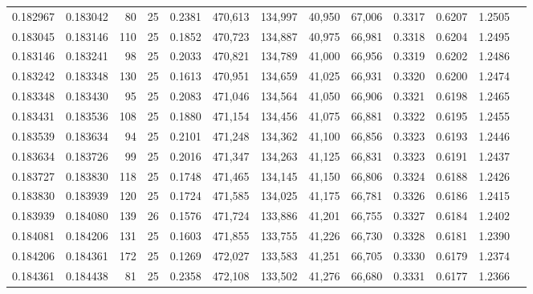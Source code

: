 \begin{tabular}{rrrrrrrrrrrrr}
0.182967 & 0.183042 &    80 &  25 &                                     0.2381 & 470,613 & 134,997 &  40,950 &  67,006 & 0.3317 & 0.6207 & 1.2505 \\
0.183045 & 0.183146 &   110 &  25 &                                     0.1852 & 470,723 & 134,887 &  40,975 &  66,981 & 0.3318 & 0.6204 & 1.2495 \\
0.183146 & 0.183241 &    98 &  25 &                                     0.2033 & 470,821 & 134,789 &  41,000 &  66,956 & 0.3319 & 0.6202 & 1.2486 \\
0.183242 & 0.183348 &   130 &  25 &                                     0.1613 & 470,951 & 134,659 &  41,025 &  66,931 & 0.3320 & 0.6200 & 1.2474 \\
0.183348 & 0.183430 &    95 &  25 &                                     0.2083 & 471,046 & 134,564 &  41,050 &  66,906 & 0.3321 & 0.6198 & 1.2465 \\
0.183431 & 0.183536 &   108 &  25 &                                     0.1880 & 471,154 & 134,456 &  41,075 &  66,881 & 0.3322 & 0.6195 & 1.2455 \\
0.183539 & 0.183634 &    94 &  25 &                                     0.2101 & 471,248 & 134,362 &  41,100 &  66,856 & 0.3323 & 0.6193 & 1.2446 \\
0.183634 & 0.183726 &    99 &  25 &                                     0.2016 & 471,347 & 134,263 &  41,125 &  66,831 & 0.3323 & 0.6191 & 1.2437 \\
0.183727 & 0.183830 &   118 &  25 &                                     0.1748 & 471,465 & 134,145 &  41,150 &  66,806 & 0.3324 & 0.6188 & 1.2426 \\
0.183830 & 0.183939 &   120 &  25 &                                     0.1724 & 471,585 & 134,025 &  41,175 &  66,781 & 0.3326 & 0.6186 & 1.2415 \\
0.183939 & 0.184080 &   139 &  26 &                                     0.1576 & 471,724 & 133,886 &  41,201 &  66,755 & 0.3327 & 0.6184 & 1.2402 \\
0.184081 & 0.184206 &   131 &  25 &                                     0.1603 & 471,855 & 133,755 &  41,226 &  66,730 & 0.3328 & 0.6181 & 1.2390 \\
0.184206 & 0.184361 &   172 &  25 &                                     0.1269 & 472,027 & 133,583 &  41,251 &  66,705 & 0.3330 & 0.6179 & 1.2374 \\
0.184361 & 0.184438 &    81 &  25 &                                     0.2358 & 472,108 & 133,502 &  41,276 &  66,680 & 0.3331 & 0.6177 & 1.2366 \\

\end{tabular}
